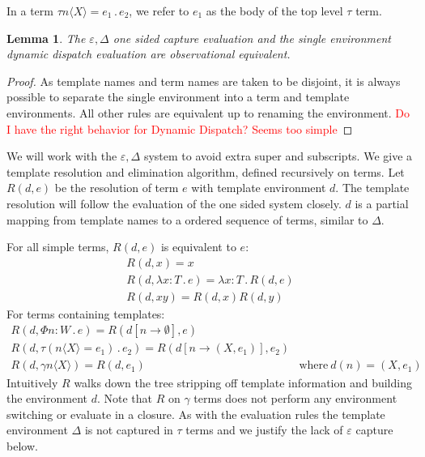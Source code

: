 \documentclass{article}
\newcommand{\todo}[1]{\textcolor{red}{#1}}
\newcommand{\la}{\langle}
\newcommand{\ra}{\rangle}
\newcommand{\ve}{\varepsilon}
\newcommand{\de}{\Delta}
\newcommand{\st}{\,.\,}
\newcommand{\cl}{{\colon}}
\newtheorem{lemma}[theorem]{Lemma}
\begin{document}
In a term $\tau n \la X \ra = e_1 \st e_2$, we refer to $e_1$ as the body of the top level $\tau$ term.

\begin{lemma}
  The $\ve,\de$ one sided capture evaluation and the single environment dynamic dispatch evaluation are observational equivalent.
\end{lemma}
\begin{proof}
  As template names and term names are taken to be disjoint, it is always possible to separate the single environment into a term and template environments. All other rules are equivalent up to renaming the environment. \todo{Do I have the right behavior for Dynamic Dispatch? Seems too simple}
\end{proof}

We will work with the $\ve,\de$ system to avoid extra super and subscripts. We give a template resolution and elimination algorithm, defined recursively on terms. Let $R(d,e)$ be the resolution of term $e$ with template environment $d$. The template resolution will follow the evaluation of the one sided system closely. $d$ is a partial mapping from template names to a ordered sequence of terms, similar to $\de$. 

For all simple terms, $R(d,e)$ is equivalent to $e$:
\begin{displaymath}
  \begin{array}{c}
    R(d,x) = x  \\[10pt]
    R(d, \lambda x\cl T \st e) = \lambda x \cl T \st R(d,e)\\[10pt]
    R(d,xy) = R(d,x)R(d,y)
  \end{array}
\end{displaymath}
For terms containing templates:
\begin{displaymath}
  \begin{array}{cc}
    R(d,\Phi n \cl W \st e) = R(d[n\to \emptyset], e) & \\[10pt]
    R(d,\tau (n \langle X \rangle = e_1) \st e_2) = R(d[n \to (X,e_1)], e_2) & \\[10pt]
    R(d,\gamma n \langle X \rangle) = R(d,e_1) & \mathrm{where}\ d(n) = (X,e_1)
  \end{array}
\end{displaymath}
Intuitively $R$ walks down the tree stripping off template information and building the environment $d$. Note that $R$ on $\gamma$ terms does not perform any environment switching or evaluate in a closure. As with the evaluation rules the template environment $\de$ is not captured in $\tau$ terms and we justify the lack of $\ve$ capture below.
\end{document}
